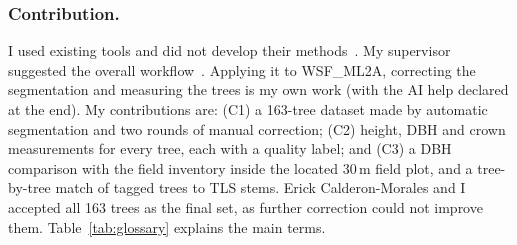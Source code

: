 \documentclass[runningheads]{llncs}
\begin{document}
\subsubsection{Contribution.}
I used existing tools and did not develop their methods~\cite{lowe2021,terryn2023}. My supervisor suggested the overall workflow~\cite{pipeline}. Applying it to WSF\_ML2A, correcting the segmentation and measuring the trees is my own work (with the AI help declared at the end). My contributions are: (C1) a 163-tree dataset made by automatic segmentation and two rounds of manual correction; (C2) height, DBH and crown measurements for every tree, each with a quality label; and (C3) a DBH comparison with the field inventory inside the located 30\,m field plot, and a tree-by-tree match of tagged trees to TLS stems. Erick Calderon-Morales and I accepted all 163 trees as the final set, as further correction could not improve them. Table~\ref{tab:glossary} explains the main terms.
\end{document}

